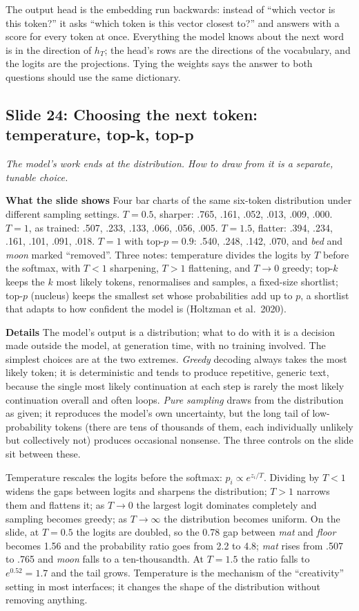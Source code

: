 \documentclass[11pt,letterpaper]{article}
\newcommand{\slide}[3]{%
  \subsection[Slide #1: #2]{Slide #1: #2}%
  {\color{muted}\itshape #3\par}\medskip}
\newcommand{\para}[1]{\medskip\noindent\textbf{#1}\quad}
\newenvironment{intuition}{\begin{tcolorbox}[intuitionbox]}{\end{tcolorbox}}
\begin{document}
\begin{intuition}
The output head is the embedding run backwards: instead of ``which vector is this token?'' it asks ``which token is this vector closest to?'' and answers with a score for every token at once. Everything the model knows about the next word is in the direction of $h_T$; the head's rows are the directions of the vocabulary, and the logits are the projections. Tying the weights says the answer to both questions should use the same dictionary.
\end{intuition}

\slide{24}{Choosing the next token: temperature, top-k, top-p}{The model's work ends at the distribution. How to draw from it is a separate, tunable choice.}

\para{What the slide shows} Four bar charts of the same six-token distribution under different sampling settings. $T=0.5$, sharper: .765, .161, .052, .013, .009, .000. $T=1$, as trained: .507, .233, .133, .066, .056, .005. $T=1.5$, flatter: .394, .234, .161, .101, .091, .018. $T=1$ with top-$p=0.9$: .540, .248, .142, .070, and \emph{bed} and \emph{moon} marked ``removed''. Three notes: temperature divides the logits by $T$ before the softmax, with $T<1$ sharpening, $T>1$ flattening, and $T\to0$ greedy; top-$k$ keeps the $k$ most likely tokens, renormalises and samples, a fixed-size shortlist; top-$p$ (nucleus) keeps the smallest set whose probabilities add up to $p$, a shortlist that adapts to how confident the model is (Holtzman et al.\ 2020).

\para{Details} The model's output is a distribution; what to do with it is a decision made outside the model, at generation time, with no training involved. The simplest choices are at the two extremes. \emph{Greedy} decoding always takes the most likely token; it is deterministic and tends to produce repetitive, generic text, because the single most likely continuation at each step is rarely the most likely continuation overall and often loops. \emph{Pure sampling} draws from the distribution as given; it reproduces the model's own uncertainty, but the long tail of low-probability tokens (there are tens of thousands of them, each individually unlikely but collectively not) produces occasional nonsense. The three controls on the slide sit between these.

Temperature rescales the logits before the softmax: $p_i\propto e^{z_i/T}$. Dividing by $T<1$ widens the gaps between logits and sharpens the distribution; $T>1$ narrows them and flattens it; as $T\to0$ the largest logit dominates completely and sampling becomes greedy; as $T\to\infty$ the distribution becomes uniform. On the slide, at $T=0.5$ the logits are doubled, so the 0.78 gap between \emph{mat} and \emph{floor} becomes 1.56 and the probability ratio goes from 2.2 to 4.8; \emph{mat} rises from .507 to .765 and \emph{moon} falls to a ten-thousandth. At $T=1.5$ the ratio falls to $e^{0.52}=1.7$ and the tail grows. Temperature is the mechanism of the ``creativity'' setting in most interfaces; it changes the shape of the distribution without removing anything.
\end{document}
